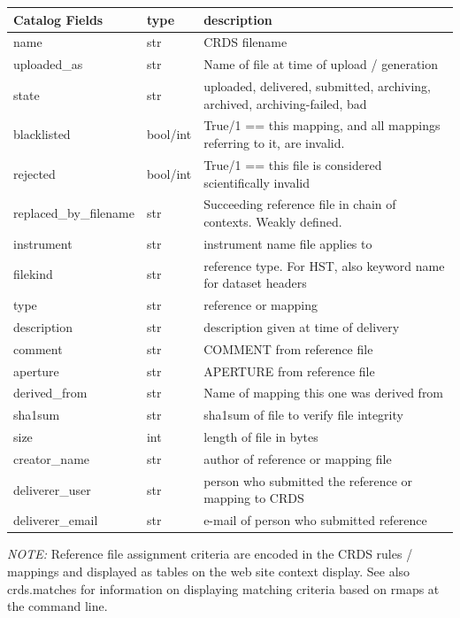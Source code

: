 \documentclass[letterpaper,10pt,english]{sphinxmanual}
\begin{document}
\begin{tabulary}{\linewidth}{|L|L|L|}
\hline
\textsf{\relax 
Catalog Fields
} & \textsf{\relax 
type
} & \textsf{\relax 
description
}\\
\hline
name
 & 
str
 & 
CRDS filename
\\
\hline
uploaded\_as
 & 
str
 & 
Name of file at time of upload / generation
\\
\hline
state
 & 
str
 & 
uploaded, delivered, submitted, archiving, archived, archiving-failed, bad
\\
\hline
blacklisted
 & 
bool/int
 & 
True/1 == this mapping,  and all mappings referring to it, are invalid.
\\
\hline
rejected
 & 
bool/int
 & 
True/1 == this file is considered scientifically invalid
\\
\hline
replaced\_by\_filename
 & 
str
 & 
Succeeding reference file in chain of contexts.  Weakly defined.
\\
\hline
instrument
 & 
str
 & 
instrument name file applies to
\\
\hline
filekind
 & 
str
 & 
reference type. For HST,  also keyword name for dataset headers
\\
\hline
type
 & 
str
 & 
reference or mapping
\\
\hline
description
 & 
str
 & 
description given at time of delivery
\\
\hline
comment
 & 
str
 & 
COMMENT from reference file
\\
\hline
aperture
 & 
str
 & 
APERTURE from reference file
\\
\hline
derived\_from
 & 
str
 & 
Name of mapping this one was derived from
\\
\hline
sha1sum
 & 
str
 & 
sha1sum of file to verify file integrity
\\
\hline
size
 & 
int
 & 
length of file in bytes
\\
\hline
creator\_name
 & 
str
 & 
author of reference or mapping file
\\
\hline
deliverer\_user
 & 
str
 & 
person who submitted the reference or mapping to CRDS
\\
\hline
deliverer\_email
 & 
str
 & 
e-mail of person who submitted reference
\\
\hline\end{tabulary}


\emph{NOTE:} Reference file assignment criteria are encoded in the CRDS rules / mappings and displayed as tables on
the web site context display.   See also crds.matches for information on displaying matching criteria based on rmaps
at the command line.



\renewcommand{\indexname}{Index}
\printindex
\end{document}
